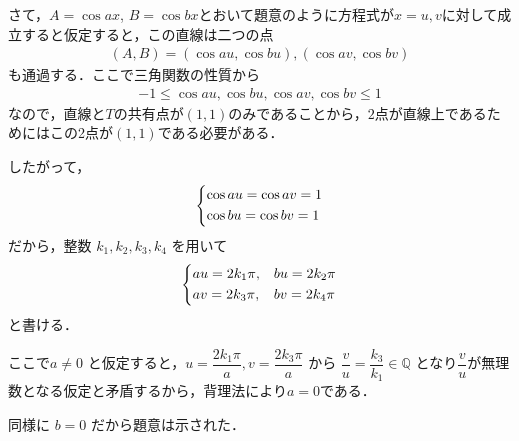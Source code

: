 \documentclass[../../main.tex]{subfiles}
\begin{document}
さて，$A=\cos ax$, $B=\cos bx$とおいて題意のように方程式が$x=u,v$に対して成立すると仮定すると，この直線は二つの点
\begin{align}
  (A, B) = (\cos au, \cos bu), (\cos av, \cos bv)
\end{align}
も通過する．ここで三角関数の性質から
\begin{align}
  -1 \le \cos au, \cos bu, \cos av, \cos bv \le 1
\end{align}
なので，直線と$T$の共有点が$(1,1)$のみであることから，$2$点が直線上であるためにはこの2点が$(1,1)$である必要がある．

したがって，
\begin{align}
  \begin{dcases}
    \cos au = \cos av = 1 \\
    \cos bu = \cos bv = 1
  \end{dcases}
\end{align}
だから，整数 $k_1,k_2,k_3,k_4$ を用いて
\begin{align}
  \begin{dcases}
    au = 2k_1 \pi, & bu = 2k_2 \pi \\
    av = 2k_3 \pi, & bv = 2k_4 \pi
  \end{dcases}
\end{align}
と書ける．

ここで$a \neq 0$ と仮定すると，$u = \dfrac{2k_1 \pi}{a}, v = \dfrac{2k_3 \pi}{a}$ から $\dfrac{v}{u} = \dfrac{k_3}{k_1} \in \mathbb{Q}$ となり$\dfrac{v}{u}$が無理数となる仮定と矛盾するから，背理法により$a = 0$である．

同様に $b = 0$ だから題意は示された．

\newpage
\end{document}
